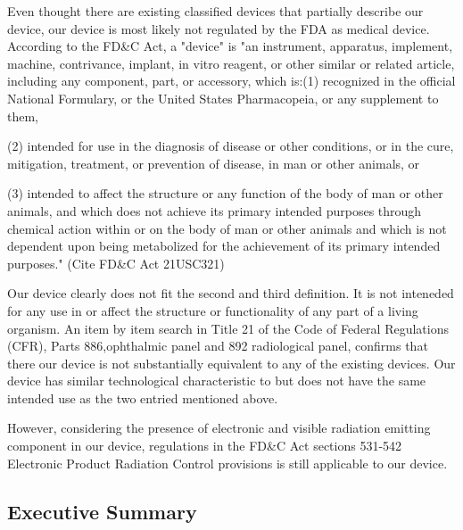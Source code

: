 \documentclass{article}
\begin{document}
Even thought there are existing classified devices that partially
describe our device, our device is most likely not regulated by the
FDA as medical device. According to the FD\&C Act, a "device" is "an
instrument, apparatus, implement, machine, contrivance, implant, in
vitro reagent, or other similar or related article, including any
component, part, or accessory, which is:(1) recognized in the official
National Formulary, or the United States Pharmacopeia, or any
supplement to them,

(2) intended for use in the diagnosis of disease or other conditions,
or in the cure, mitigation, treatment, or prevention of disease, in
man or other animals, or

(3) intended to affect the structure or any function of the body of
man or other animals, and which does not achieve its primary intended
purposes through chemical action within or on the body of man or other
animals and which is not dependent upon being metabolized for the
achievement of its primary intended purposes." (Cite FD\&C Act
21USC321)

Our device clearly does not fit the second and third definition. It is
not inteneded for any use in or affect the structure or functionality
of any part of a living organism. An item by item search in Title 21
of the Code of Federal Regulations (CFR), Parts 886,ophthalmic panel
and 892 radiological panel, confirms that there our device is not
substantially equivalent to any of the existing devices. Our device
has similar technological characteristic to but does not have the same
intended use as the two entried mentioned above.

However, considering the presence of electronic and visible radiation
emitting component in our device, regulations in the FD\&C Act
sections 531-542 Electronic Product Radiation Control provisions is
still applicable to our device.










\setcounter{subsection}{0}
\subsection{Executive Summary}
\end{document}
